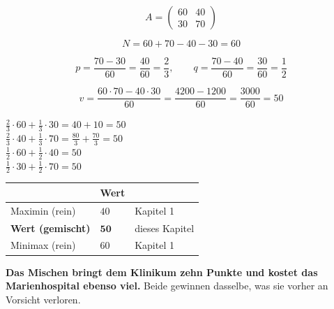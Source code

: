 \begin{merksatz}
\[ A = \begin{pmatrix} 60 & 40\\ 30 & 70\end{pmatrix} \]

\[ N = 60+70-40-30 = 60 \]

\[ p = \frac{70-30}{60} = \frac{40}{60} = \frac23, \qquad q = \frac{70-40}{60} = \frac{30}{60} = \frac12 \]

\[ v = \frac{60\cdot70 - 40\cdot30}{60} = \frac{4200-1200}{60} = \frac{3000}{60} = 50 \]

 $\tfrac23\cdot60 + \tfrac13\cdot30 = 40+10 = 50$ \checkmark\\
 $\tfrac23\cdot40 + \tfrac13\cdot70 = \tfrac{80}{3}+\tfrac{70}{3} = 50$ \checkmark\\
 $\tfrac12\cdot60+\tfrac12\cdot40 = 50$ \checkmark\\
 $\tfrac12\cdot30+\tfrac12\cdot70 = 50$ \checkmark

\begin{center}
{\small
\renewcommand{\arraystretch}{1.5}
\begin{tabular}{@{}P{2.6cm}P{1.8cm}P{2.8cm}@{}}
\toprule
& \textbf{Wert} & \\
\midrule
Maximin (rein) & $40$ & Kapitel 1\\
\textbf{Wert (gemischt)} & $\mathbf{50}$ & dieses Kapitel\\
Minimax (rein) & $60$ & Kapitel 1\\
\bottomrule
\end{tabular}}
\end{center}

\begin{center}
\begin{minipage}{0.9\textwidth}
\textbf{Das Mischen bringt dem Klinikum zehn Punkte und kostet das Marienhospital ebenso viel.} Beide gewinnen dasselbe, was sie vorher an Vorsicht verloren.
\end{minipage}
\end{center}

\begin{center}
\begin{minipage}{0.88\textwidth}
\end{minipage}
\end{center}
\end{merksatz}

